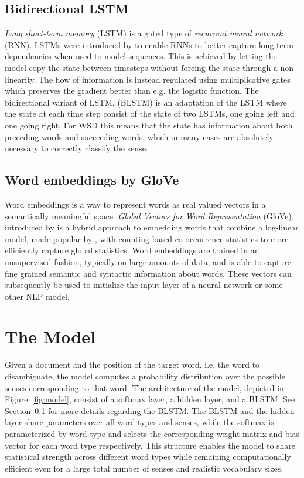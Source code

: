 \documentclass[11pt]{article}
\newcommand{\Sec}[1]{Section~\ref{#1}}
\newcommand{\Fig}[1]{Figure~\ref{#1}}
\def\glove{GloVe}
\begin{document}
\subsection{Bidirectional LSTM}
\label{sec:BLSTM}
\emph{Long short-term memory} (LSTM) is a gated type of  \emph{recurrent neural network} (RNN). LSTMs were introduced by  to enable RNNs to better capture long term dependencies when used to model sequences. This is achieved by letting the model copy the state between timesteps without forcing the state through a non-linearity. The flow of information is instead regulated using multiplicative gates which preserves the gradient better than e.g. the logistic function.
The bidirectional variant of LSTM, (BLSTM) \cite{graves2005framewise} is an adaptation of the LSTM where the state at each time step consist of the state of two LSTMs, one going left and one going right. For WSD this means that the state has information about both preceding words and succeeding words, which in many cases are absolutely necessary to correctly classify the sense. 
\subsection{Word embeddings by \glove}
Word embeddings is a way to represent words as real valued vectors in a semantically meaningful space. \emph{Global Vectors for Word Representation} (\glove), introduced by  is a hybrid approach to embedding words that combine a log-linear model, made popular by , with counting based co-occurrence statistics to more efficiently capture global statistics. Word embeddings are trained in an unsupervised fashion, typically on large amounts of data, and is able to capture fine grained semantic and syntactic information about words. These vectors can subsequently be used to initialize the input layer of a neural network or some other NLP model.


%
 \section{The Model}
Given a document and the position of the target word, i.e. the word to disambiguate, the model computes a probability distribution over the possible senses corresponding to that word. The architecture of the model, depicted in \Fig{fig:model}, consist of a softmax layer, a hidden layer, and a BLSTM. See \Sec{sec:BLSTM} for more details regarding the BLSTM. The BLSTM and the hidden layer share parameters over all word types and senses, while the softmax is parameterized by word type and selects the corresponding weight matrix and bias vector for each word type respectively. This structure enables the model to share statistical strength across different word types while remaining computationally efficient even for a large total number of senses and realistic vocabulary sizes.
\end{document}
